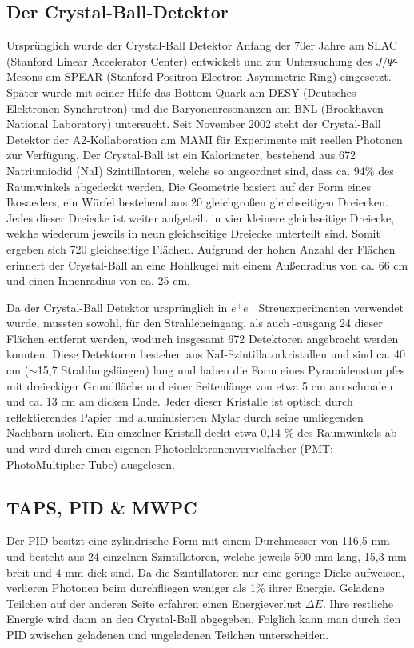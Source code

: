 \documentclass[a4paper,11pt,oneside,final,german,openbib,pdftex]{scrbook}
\begin{document}
{\subsection{Der Crystal-Ball-Detektor}
Ursprünglich wurde der Crystal-Ball Detektor Anfang der 70er Jahre am SLAC (Stanford Linear Accelerator Center) entwickelt und zur Untersuchung des $J/\Psi$-Mesons am SPEAR (Stanford Positron Electron Asymmetric Ring) eingesetzt. Später wurde mit seiner Hilfe das Bottom-Quark am DESY (Deutsches Elektronen-Synchrotron) und die Baryonenresonanzen am BNL (Brookhaven National Laboratory) untersucht.
Seit November 2002 steht der Crystal-Ball Detektor der A2-Kollaboration am MAMI für Experimente mit reellen Photonen zur Verfügung.
\newline
Der Crystal-Ball ist ein Kalorimeter, bestehend aus 672 Natriumiodid (NaI) Szintillatoren, welche so angeordnet sind, dass ca. 94\% des Raumwinkels abgedeckt werden. Die Geometrie basiert auf der Form eines Ikosaeders, ein W\"urfel bestehend aus 20 gleichgro{\ss}en gleichseitigen Dreiecken. Jedes dieser Dreiecke ist weiter aufgeteilt in vier kleinere gleichseitige Dreiecke, welche wiederum jeweils in neun gleichseitige Dreiecke unterteilt sind. Somit ergeben sich 720 gleichseitige Fl\"achen. Aufgrund der hohen Anzahl der Fl\"achen erinnert der Crystal-Ball an eine Hohlkugel mit einem Au{\ss}enradius von ca. 66 cm und einen Innenradius von ca. 25 cm. 

Da der Crystal-Ball Detektor urspr\"unglich in $e^+e^-$ Streuexperimenten verwendet wurde, mussten sowohl, f\"ur den Strahleneingang, als auch -ausgang 24 dieser Fl\"achen entfernt werden, wodurch insgesamt 672 Detektoren angebracht werden konnten. Diese Detektoren bestehen aus NaI-Szintillatorkristallen und sind ca. 40 cm ($\sim$15,7 Strahlungsl\"angen) lang und haben die Form eines Pyramidenstumpfes mit dreieckiger Grundfl\"ache und einer Seitenl\"ange von etwa 5 cm am schmalen und ca. 13 cm am dicken Ende. Jeder dieser Kristalle ist optisch durch reflektierendes Papier und aluminisierten Mylar durch seine umliegenden Nachbarn isoliert. Ein einzelner Kristall deckt etwa 0,14 \% des Raumwinkels ab und wird durch einen eigenen Photoelektronenvervielfacher (PMT: PhotoMultiplier-Tube) ausgelesen. 



\subsection{TAPS, PID \& MWPC}
\label{sec:TAPS-PID-MWPC}
Der PID besitzt eine zylindrische Form mit einem Durchmesser von 116,5 mm und besteht aus 24 einzelnen Szintillatoren, welche jeweils 500 mm lang, 15,3 mm breit und 4 mm dick sind. Da die Szintillatoren nur eine geringe Dicke aufweisen, verlieren Photonen beim durchfliegen weniger als 1\% ihrer Energie. Geladene Teilchen auf der anderen Seite erfahren einen Energieverlust $\Delta E$. Ihre restliche Energie wird dann an den Crystal-Ball abgegeben. Folglich kann man durch den PID zwischen geladenen und ungeladenen Teilchen unterscheiden. 

}
\end{document}
